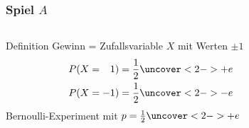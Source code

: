 %
%
%
\bgroup
\begin{frame}[t]
\setlength{\abovedisplayskip}{5pt}
\setlength{\belowdisplayskip}{5pt}
\frametitle{Spiel $A$}
\vspace{-20pt}
\begin{columns}[t,onlytextwidth]
\begin{column}{0.48\textwidth}
\begin{block}{Definition}
Gewinn = Zufallsvariable $X$ mit Werten $\pm 1$
\begin{align*}
P(X=\phantom{+}1)
&=
\frac12\uncover<2->{+e}
\\
P(X=         - 1)
&=
\frac12\uncover<2->{-e}
\end{align*}
Bernoulli-Experiment mit $p=\frac12\uncover<2->{+e}$
\end{block}
\end{column}
\begin{column}{0.48\textwidth}
\end{column}
\end{columns}
\end{frame}
\egroup
